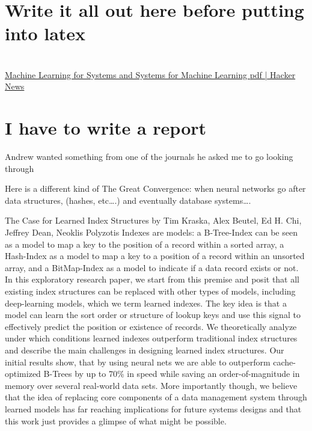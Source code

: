 \documentclass[11pt]{article}
\begin{document}
\section{Write it all out here before putting into latex}
\label{sec:orgfc418f4}

\section{}
\label{sec:org7084eb4}
\href{https://news.ycombinator.com/item?id=15892956}{Machine Learning for Systems and Systems for Machine Learning  pdf  | Hacker News}

\section{I have to write a report}
\label{sec:org8fce2dc}
Andrew wanted something from one of the journals he asked me to go looking through

Here is a different kind of The Great Convergence: when neural networks go after data structures, (hashes, etc\ldots{}.) and eventually database systems\ldots{}.

The Case for Learned Index Structures by Tim Kraska, Alex Beutel, Ed H. Chi, Jeffrey Dean, Neoklis Polyzotis
Indexes are models: a B-Tree-Index can be seen as a model to map a key to the position of a record within a sorted array, a Hash-Index as a model to map a key to a position of a record within an unsorted array, and a BitMap-Index as a model to indicate if a data record exists or not. In this exploratory research paper, we start from this premise and posit that all existing index structures can be replaced with other types of models, including deep-learning models, which we term learned indexes. The key idea is that a model can learn the sort order or structure of lookup keys and use this signal to effectively predict the position or existence of records. We theoretically analyze under which conditions learned indexes outperform traditional index structures and describe the main challenges in designing learned index structures. Our initial results show, that by using neural nets we are able to outperform cache-optimized B-Trees by up to 70\% in speed while saving an order-of-magnitude in memory over several real-world data sets. More importantly though, we believe that the idea of replacing core components of a data management system through learned models has far reaching implications for future systems designs and that this work just provides a glimpse of what might be possible.
\end{document}
